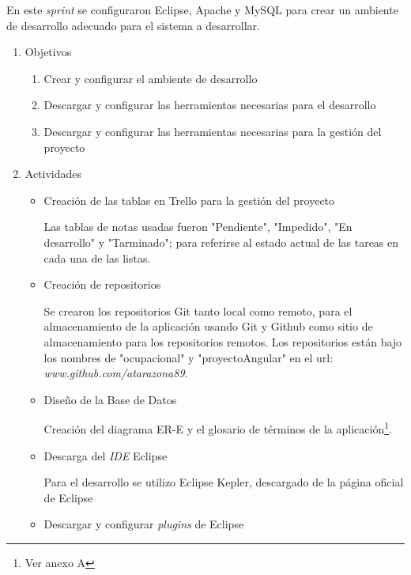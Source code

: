     En este \textit{sprint} se configuraron Eclipse, Apache y MySQL para crear un ambiente de desarrollo adecuado para el sistema a desarrollar.
    
    \begin{enumerate}
        \item Objetivos
        \begin{enumerate}
            \item Crear y configurar el ambiente de desarrollo
            \item Descargar y configurar las herramientas necesarias para el desarrollo
            \item Descargar y configurar las herramientas necesarias para la gestión del proyecto         
        \end{enumerate}
        \item Actividades
        \begin{itemize}
            \item Creación de las tablas en Trello para la gestión del proyecto
            
            Las tablas de notas usadas fueron "Pendiente", "Impedido", "En desarrollo" y "Tarminado"; para referirse al estado actual de las tareas en cada una de las listas.
            
            \item Creación de repositorios
            
            Se crearon los repositorios Git tanto local como remoto, para el almacenamiento de la aplicación usando Git y Github como sitio de almacenamiento para los repositorios remotos. Los repositorios están bajo los nombres de "ocupacional" y "proyectoAngular" en el url: \textit{www.github.com/atarazona89}.
            
            \item Diseño de la Base de Datos
            
            Creación del diagrama ER-E y el glosario de términos de la aplicación\footnote{Ver anexo A}.
            
            \item Descarga del \textit{IDE} Eclipse
            
            Para el desarrollo se utilizo Eclipse Kepler, descargado de la página oficial de Eclipse\cite{ECLIPSE-eclipseorg}
            
           \item Descargar y configurar \textit{plugins} de Eclipse
           

\end{itemize}
\end{enumerate}
